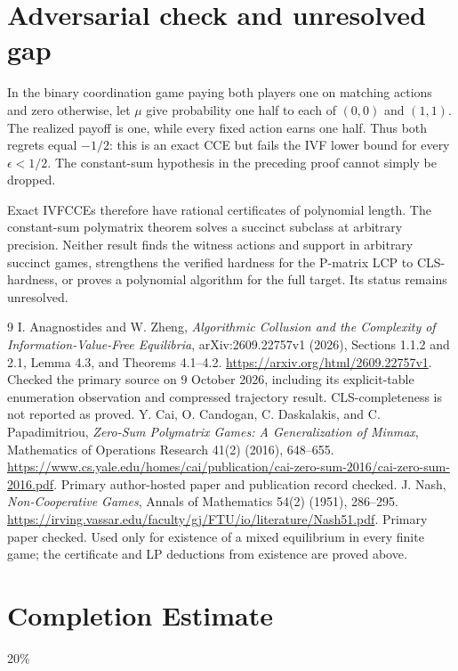 \documentclass[11pt]{article}
\theoremstyle{definition}
\begin{document}
\section*{Adversarial check and unresolved gap}
In the binary coordination game paying both players one on matching actions and zero otherwise, let $\mu$ give probability one half to each of $(0,0)$ and $(1,1)$. The realized payoff is one, while every fixed action earns one half. Thus both regrets equal $-1/2$: this is an exact CCE but fails the IVF lower bound for every $\epsilon<1/2$. The constant-sum hypothesis in the preceding proof cannot simply be dropped.

Exact IVFCCEs therefore have rational certificates of polynomial length. The constant-sum polymatrix theorem solves a succinct subclass at arbitrary precision. Neither result finds the witness actions and support in arbitrary succinct games, strengthens the verified hardness for the P-matrix LCP to CLS-hardness, or proves a polynomial algorithm for the full target. Its status remains unresolved.

\begin{thebibliography}{9}
 I. Anagnostides and W. Zheng, \emph{Algorithmic Collusion and the Complexity of Information-Value-Free Equilibria}, arXiv:2609.22757v1 (2026), Sections 1.1.2 and 2.1, Lemma 4.3, and Theorems 4.1--4.2. \url{https://arxiv.org/html/2609.22757v1}. Checked the primary source on 9 October 2026, including its explicit-table enumeration observation and compressed trajectory result. CLS-completeness is not reported as proved.
 Y. Cai, O. Candogan, C. Daskalakis, and C. Papadimitriou, \emph{Zero-Sum Polymatrix Games: A Generalization of Minmax}, Mathematics of Operations Research 41(2) (2016), 648--655. \url{https://www.cs.yale.edu/homes/cai/publication/cai-zero-sum-2016/cai-zero-sum-2016.pdf}. Primary author-hosted paper and publication record checked.
 J. Nash, \emph{Non-Cooperative Games}, Annals of Mathematics 54(2) (1951), 286--295. \url{https://irving.vassar.edu/faculty/gj/FTU/io/literature/Nash51.pdf}. Primary paper checked. Used only for existence of a mixed equilibrium in every finite game; the certificate and LP deductions from existence are proved above.
\end{thebibliography}

\section{Completion Estimate}
20\%
\end{document}
